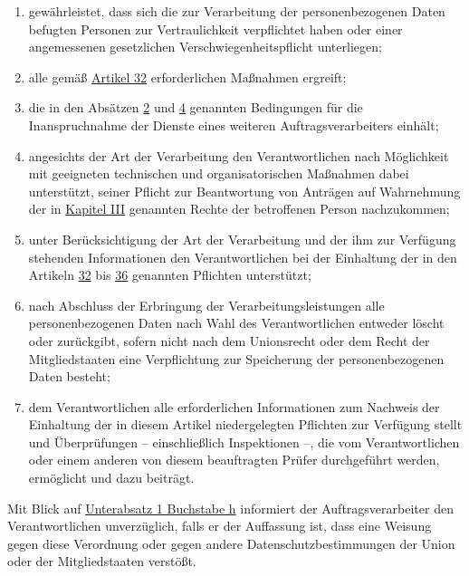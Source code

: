 \begin{enumerate}
\begin{enumerate}
    \item gewährleistet, dass sich die zur Verarbeitung der personenbezogenen Daten befugten Personen zur
     Vertraulichkeit verpflichtet haben oder einer angemessenen gesetzlichen Verschwiegenheitspflicht unterliegen;
    \label{itm:28-3-1b}

    \item alle gemäß \hyperref[ch:32]{Artikel 32} erforderlichen Maßnahmen ergreift;
    \label{itm:28-3-1c}

    \item die in den Absätzen \hyperref[itm:28-2]{2} und \hyperref[itm:28-4]{4} genannten Bedingungen für die
     Inanspruchnahme der Dienste eines weiteren Auftragsverarbeiters einhält;
    \label{itm:28-3-1d}

    \item angesichts der Art der Verarbeitung den Verantwortlichen nach Möglichkeit mit geeigneten technischen und
     organisatorischen Maßnahmen dabei unterstützt, seiner Pflicht zur Beantwortung von Anträgen auf Wahrnehmung der in
     \hyperref[part:3]{Kapitel III} genannten Rechte der betroffenen Person nachzukommen;
    \label{itm:28-3-1e}

    \item unter Berücksichtigung der Art der Verarbeitung und der ihm zur Verfügung stehenden Informationen den
     Verantwortlichen bei der Einhaltung der in den Artikeln \hyperref[ch:32]{32} bis \hyperref[ch:36]{36} genannten
     Pflichten unterstützt;
    \label{itm:28-3-1f}

    \item nach Abschluss der Erbringung der Verarbeitungsleistungen alle personenbezogenen Daten nach Wahl des
     Verantwortlichen entweder löscht oder zurückgibt, sofern nicht nach dem Unionsrecht oder dem Recht der
     Mitgliedstaaten eine Verpflichtung zur Speicherung der personenbezogenen Daten besteht;
    \label{itm:28-3-1g}

    \item dem Verantwortlichen alle erforderlichen Informationen zum Nachweis der Einhaltung der in diesem Artikel
     niedergelegten Pflichten zur Verfügung stellt und Überprüfungen -- einschließlich Inspektionen –, die vom
     Verantwortlichen oder einem anderen von diesem beauftragten Prüfer durchgeführt werden, ermöglicht und dazu
     beiträgt.
    \label{itm:28-3-1h}

  \end{enumerate}

  Mit Blick auf \hyperref[itm:28-3-1h]{Unterabsatz 1 Buchstabe h} informiert der Auftragsverarbeiter den
  Verantwortlichen
  unverzüglich, falls er der Auffassung ist, dass eine Weisung gegen diese Verordnung oder gegen andere
  Datenschutzbestimmungen der Union oder der Mitgliedstaaten verstößt.
  \label{itm:28-3-2}


\end{enumerate}
